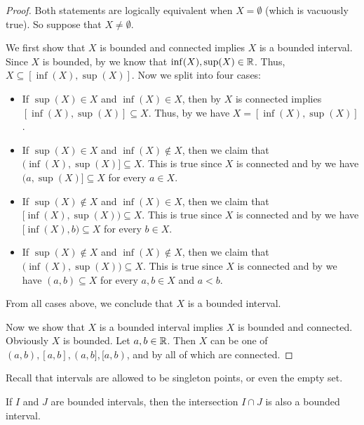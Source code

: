 \begin{proof}
  Both statements are logically equivalent when \(X = \emptyset\) (which is vacuously true).
  So suppose that \(X \neq \emptyset\).

  We first show that \(X\) is bounded and connected implies \(X\) is a bounded interval.
  Since \(X\) is bounded, by  we know that \(\inf(X), \sup(X) \in \mathbb{R}\).
  Thus, \(X \subseteq [\inf(X), \sup(X)]\).
  Now we split into four cases:
  \begin{itemize}
    \item If \(\sup(X) \in X\) and \(\inf(X) \in X\), then by  \(X\) is connected implies \([\inf(X), \sup(X)] \subseteq X\).
          Thus, by  we have \(X = [\inf(X), \sup(X)]\).
    \item If \(\sup(X) \in X\) and \(\inf(X) \notin X\), then we claim that \(\big(\inf(X), \sup(X)] \subseteq X\).
          This is true since \(X\) is connected and by  we have \(\big(a, \sup(X)] \subseteq X\) for every \(a \in X\).
    \item If \(\sup(X) \notin X\) and \(\inf(X) \in X\), then we claim that \([\inf(X), \sup(X)\big) \subseteq X\).
          This is true since \(X\) is connected and by  we have \([\inf(X), b\big) \subseteq X\) for every \(b \in X\).
    \item If \(\sup(X) \notin X\) and \(\inf(X) \notin X\), then we claim that \(\big(\inf(X), \sup(X)\big) \subseteq X\).
          This is true since \(X\) is connected and by  we have \((a, b) \subseteq X\) for every \(a, b \in X\) and \(a < b\).
  \end{itemize}
  From all cases above, we conclude that \(X\) is a bounded interval.

  Now we show that \(X\) is a bounded interval implies \(X\) is bounded and connected.
  Obviously \(X\) is bounded.
  Let \(a, b \in \mathbb{R}\).
  Then \(X\) can be one of \((a, b), [a, b], (a, b], [a, b)\), and by  all of which are connected.
\end{proof}

\begin{rmk}\label{i:11.1.5}
  Recall that intervals are allowed to be singleton points, or even the empty set.
\end{rmk}

\begin{cor}\label{i:11.1.6}
  If \(I\) and \(J\) are bounded intervals, then the intersection \(I \cap J\) is also a bounded interval.
\end{cor}

